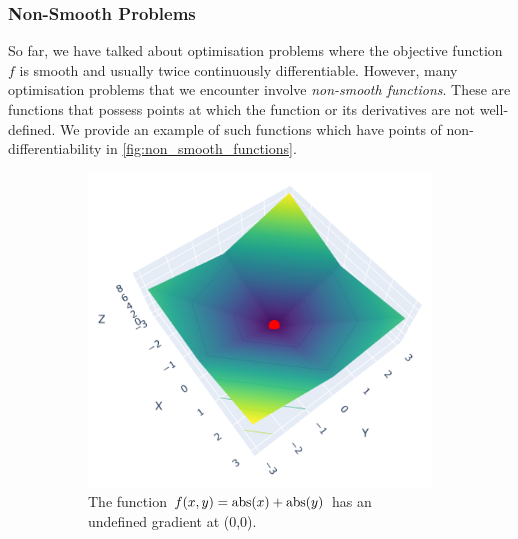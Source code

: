 \subsubsection{Non-Smooth Problems}
\label{sssec:non_smooth_problems}

So far, we have talked about optimisation problems where the objective function $f$ is smooth and usually twice continuously differentiable. However, many optimisation problems that we encounter involve \textit{non-smooth functions}. These are functions that possess points at which the function or its derivatives are not well-defined. We provide an example of such functions which have points of non-differentiability in \cref{fig:non_smooth_functions}. 

\begin{figure}[h]
    \begin{subfigure}[b]{0.48\linewidth}
        \centering
        \includegraphics[width=\linewidth]{figures/2background/abs_func.png}
        \caption{The function
        $f(x, y) =\operatorname{abs}(x) + \operatorname{abs}(y)$ has an undefined gradient at (0,0).}
        \label{fig:abs_function}
    \end{subfigure}
    \hfill
    \begin{subfigure}[b]{0.48\linewidth}
        \centering

\end{subfigure}
\end{figure}
